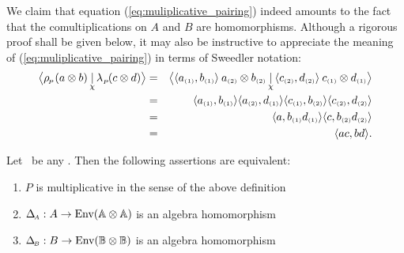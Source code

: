 \begin{remark_sec} \rm
We claim that equation (\ref{eq:muliplicative_pairing}) indeed amounts to the fact that
the comultiplications on $A$ and $B$ are homomorphisms.
Although a rigorous proof shall be given below, it may also be instructive to
appreciate the meaning of (\ref{eq:muliplicative_pairing}) in terms of Sweedler notation:
\begin{eqnarray*}
\pairflipM{\rp(a \tens b)}{\lp(c\tens d)}
&=&
\pairflipM{\pair{\sweed{a}{1}}{\sweed{b}{1}} \: \sweed{a}{2} \tens  \sweed{b}{2}}{
           \pair{\sweed{c}{2}}{\sweed{d}{2}} \: \sweed{c}{1} \tens \sweed{d}{1}}
\\&=&
\pair{\sweed{a}{1}}{\sweed{b}{1}}
\pair{\sweed{a}{2}}{\sweed{d}{1}}
\pair{\sweed{c}{1}}{\sweed{b}{2}}
\pair{\sweed{c}{2}}{\sweed{d}{2}}
\\&=&
\pair{a}{\sweed{b}{1} \sweed{d}{1}}
\pair{c}{\sweed{b}{2} \sweed{d}{2}}
\\&=&
\pair{ac}{bd}.
\end{eqnarray*}
\end{remark_sec}


\begin{prop_sec}  \label{prop:multiplicative:comultiplications}
Let\/ \pairAB\ be any \idpa\@.
Then the following assertions are equivalent:
\begin{enumerate}
  \item $P$ is multiplicative in the sense of the above definition
  \item $\Delta_{\scriptscriptstyle \! A} : A \rightarrow \mbox{\rm Env}(\mathbb{A} \otimes \mathbb{A})$ is an algebra homomorphism
  \item $\Delta_{\scriptscriptstyle \! B} : B \rightarrow \mbox{\rm Env}(\mathbb{B} \otimes \mathbb{B})$ is an algebra homomorphism
\end{enumerate}
\end{prop_sec}

